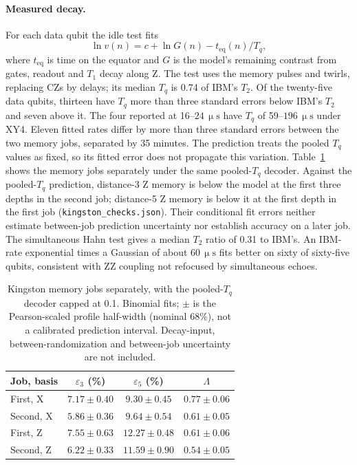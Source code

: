 \documentclass[aps,pra,reprint,nofootinbib,longbibliography,floatfix,showkeys]{revtex4-2}
\newcommand{\eps}{\varepsilon}
\newcommand{\us}{\,\upmu\mathrm{s}}
\begin{document}
\paragraph*{Measured decay.}
For each data qubit the idle test fits
\begin{equation}
\ln v(n)=c+\ln G(n)-t_\mathrm{eq}(n)/T_q,
\label{eq:tq}
\end{equation}
where $t_\mathrm{eq}$ is time on the equator and $G$ is the model's remaining contrast from gates, readout and $T_1$ decay along Z.
The test uses the memory pulses and twirls, replacing CZs by delays; its median $T_q$ is 0.74 of IBM's $T_2$.
Of the twenty-five data qubits, thirteen have $T_q$ more than three standard errors below IBM's $T_2$ and seven above it.
The four reported at 16--$24\us$ have $T_q$ of 59--$196\us$ under XY4.
Eleven fitted rates differ by more than three standard errors between the two memory jobs, separated by 35 minutes.
The prediction treats the pooled $T_q$ values as fixed, so its fitted error does not propagate this variation.
Table~\ref{tab:kingstonjobs} shows the memory jobs separately under the same pooled-$T_q$ decoder.
Against the pooled-$T_q$ prediction, distance-3 Z memory is below the model at the first three depths in the second job; distance-5 Z memory is below it at the first depth in the first job (\texttt{kingston\_checks.json}).
Their conditional fit errors neither estimate between-job prediction uncertainty nor establish accuracy on a later job.
The simultaneous Hahn test gives a median $T_2$ ratio of 0.31 to IBM's.
An IBM-rate exponential times a Gaussian of about $60\us$ fits better on sixty of sixty-five qubits, consistent with ZZ coupling not refocused by simultaneous echoes.

\begin{table}[!htb]
\caption{Kingston memory jobs separately, with the pooled-$T_q$ decoder capped at 0.1. Binomial fits; $\pm$ is the Pearson-scaled profile half-width (nominal 68\%), not a calibrated prediction interval. Decay-input, between-randomization and between-job uncertainty are not included.}
\label{tab:kingstonjobs}
\footnotesize
\begin{ruledtabular}
\begin{tabular}{lccc}
Job, basis & $\eps_3$ (\%) & $\eps_5$ (\%) & $\Lambda$ \\
\hline
First, X & $7.17\pm0.40$ & $9.30\pm0.45$ & $0.77\pm0.06$ \\
Second, X & $5.86\pm0.36$ & $9.64\pm0.54$ & $0.61\pm0.05$ \\
First, Z & $7.55\pm0.63$ & $12.27\pm0.48$ & $0.61\pm0.06$ \\
Second, Z & $6.22\pm0.33$ & $11.59\pm0.90$ & $0.54\pm0.05$ \\
\end{tabular}
\end{ruledtabular}
\end{table}
\end{document}
